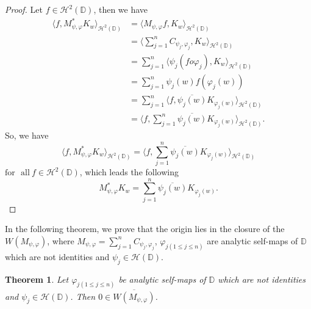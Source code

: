 \documentclass[12pt, reqno]{amsart}
\newtheorem{theorem}{Theorem}[section]
\theoremstyle{definition}
\theoremstyle{remark}
\numberwithin{equation}{section}
\begin{document}
\begin{proof}
	Let $f\in \mathcal{H}^2(\mathbb{D})$, then we have
	\begin{align*}
	\langle f,  M_{\psi, \varphi}^*K_w \rangle_{\mathcal{H}^2(\mathbb{D})}&=  \langle  M_{\psi, \varphi}f, K_w \rangle_{\mathcal{H}^2(\mathbb{D})}\\
	&=\bigg\langle \sum_{j=1}^{n}C_{\psi_j, \varphi_j} , K_w \bigg\rangle_{\mathcal{H}^2(\mathbb{D})}\\
	&=\sum_{j=1}^{n}\bigg\langle \psi_j(fo \varphi_j) , K_w \bigg\rangle_{\mathcal{H}^2(\mathbb{D})}\\
	&=\sum_{j=1}^{n}\psi_j(w) f(\varphi_j(w)) \\
	&=\sum_{j=1}^{n}\bigg\langle  f, \overline{\psi_j(w)}K_{\varphi_j(w)} \bigg\rangle_{\mathcal{H}^2(\mathbb{D})}\\
	&=\bigg\langle  f, \sum_{j=1}^{n}\overline{\psi_j(w)}K_{\varphi_j(w)} \bigg\rangle_{\mathcal{H}^2(\mathbb{D})}.
	\end{align*}
	So, we have
	$$\bigg\langle f,  M_{\psi, \varphi}^*K_w \bigg\rangle_{\mathcal{H}^2(\mathbb{D})}=\bigg\langle  f,  \sum_{j=1}^{n}\overline{\psi_j(w)}K_{\varphi_j(w)} \bigg\rangle_{\mathcal{H}^2(\mathbb{D})}$$
	$\mbox{for~ all}~ f\in \mathcal{H}^2(\mathbb{D})$,	which leads the following
	$$ M_{\psi, \varphi}^*K_w=\sum_{j=1}^{n}\overline{\psi_j(w)}K_{\varphi_j(w)}.$$
\end{proof}
In the following theorem, we prove that the origin lies in the closure of the $W(M_{\psi, \varphi})$, where $M_{\psi, \varphi}=\displaystyle\sum_{j=1}^{n}C_{\psi_j, \varphi_j} $, $\varphi_{j{(1\leq j\leq n)}}$ are analytic self-maps of $\mathbb{D}$ which are not identities and $\psi_j\in \mathcal{H}(\mathbb{D})$. 
\begin{theorem}
		Let $\varphi_{j{(1\leq j\leq n)}}$ be analytic self-maps of $\mathbb{D}$ which are not identities and $\psi_j\in \mathcal{H}(\mathbb{D})$.
		Then $0\in \overline{W(M_{\psi, \varphi})}$.
		\end{theorem}
\end{document}
